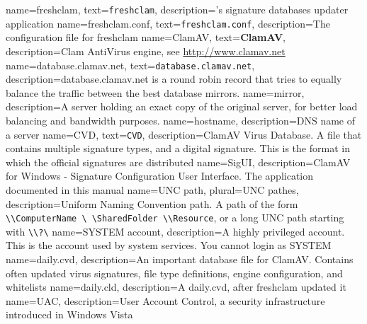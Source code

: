 {
    name={freshclam},
    text={\texttt{freshclam}},
    description={\ClamAV's signature databases updater application}
}
{
    name={freshclam.conf},
    text={\texttt{freshclam.conf}},
    description={The configuration file for \gls{freshclam}}
}
{
    name={ClamAV},
    text={\textbf{ClamAV}},
    description={Clam AntiVirus engine, see \url{http://www.clamav.net}}
}
{
    name={database.clamav.net},
    text={\texttt{database.clamav.net}},
    description={database.clamav.net is a round robin record that tries to
	equally balance the traffic between the best database mirrors.}
}
{
    name={mirror},
    description={A server holding an exact copy of the original server, for
	better load balancing and bandwidth purposes.}
}
{
    name={hostname},
    description={DNS name of a server}
}
{
    name={CVD},
    text={\texttt{CVD}},
    description={ClamAV Virus Database. A file that contains multiple signature types, and a digital signature.
	This is the format in which the official signatures are distributed}
}
{
    name={SigUI},
    description={ClamAV for Windows - Signature Configuration User Interface. The
	application documented in this manual}
}
{
    name={UNC path},
    plural={UNC pathes},
    description={Uniform Naming Convention path. A path of the form
	\texttt{\textbackslash\textbackslash ComputerName \textbackslash
	    \textbackslash SharedFolder \textbackslash\textbackslash Resource}, or a long UNC path
	    starting with \texttt{\textbackslash\textbackslash?\textbackslash}}
}
{
    name={SYSTEM account},
    description={A highly privileged account. This is the account used by system
	services. You cannot login as SYSTEM}
}
{
    name={daily.cvd},
    description={An important database file for \gls{ClamAV}. Contains often
	updated virus signatures, file type definitions, engine configuration,
	and whitelists}
}
{
    name={daily.cld},
    description={A \gls{daily.cvd}, after \gls{freshclam} updated it}
}
{
    name={UAC},
    description={User Account Control, a security infrastructure introduced in Windows Vista}
}

